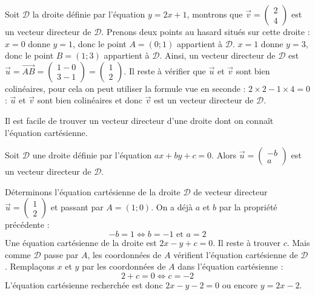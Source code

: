 	\begin{tip}[Exemple]
		Soit $\mathcal{D}$ la droite définie par l'équation $y = 2x + 1$, montrons que $\overrightarrow{v} = \begin{pmatrix} 2 \\ 4\end{pmatrix}$ est un vecteur directeur de $\mathcal{D}$.
		\newpar
		Prenons deux points au hasard situés sur cette droite :
		\newline
		$x = 0$ donne $y = 1$, donc le point $A = (0; 1)$ appartient à $\mathcal{D}$.
		\newline
		$x = 1$ donne $y = 3$, donc le point $B = (1; 3)$ appartient à $\mathcal{D}$.
		\newpar
		Ainsi, un vecteur directeur de $\mathcal{D}$ est $\overrightarrow{u} = \overrightarrow{AB} = \begin{pmatrix} 1-0 \\ 3-1\end{pmatrix} = \begin{pmatrix} 1 \\ 2\end{pmatrix}$.
		\newpar
		Il reste à vérifier que $\overrightarrow{u}$ et $\overrightarrow{v}$ sont bien colinéaires, pour cela on peut utiliser la formule vue en seconde :
		\newline
		$2 \times 2 - 1 \times 4 = 0$ : $\overrightarrow{u}$ et $\overrightarrow{v}$ sont bien colinéaires et donc $\overrightarrow{v}$ est un vecteur directeur de $\mathcal{D}$.
	\end{tip}

	Il est facile de trouver un vecteur directeur d'une droite dont on connaît l'équation cartésienne.

	\begin{formula}
		Soit $\mathcal{D}$ une droite définie par l'équation $ax + by + c = 0$. Alors $\overrightarrow{u} = \begin{pmatrix} -b \\ a\end{pmatrix}$ est un vecteur directeur de $\mathcal{D}$.
	\end{formula}

	\begin{tip}[Exemple]
		Déterminons l'équation cartésienne de la droite $\mathcal{D}$ de vecteur directeur $\overrightarrow{u} = \begin{pmatrix} 1 \\ 2\end{pmatrix}$ et passant par $A = (1; 0)$.
		\newpar
		On a déjà $a$ et $b$ par la propriété précédente :
		\[ -b = 1 \iff b = -1 \text{ et } a = 2 \]
		Une équation cartésienne de la droite est $2x - y + c = 0$. Il reste à trouver $c$. Mais comme $\mathcal{D}$ passe par $A$, les coordonnées de $A$ vérifient l'équation cartésienne de $\mathcal{D}$.
		\newpar
		Remplaçons $x$ et $y$ par les coordonnées de $A$ dans l'équation cartésienne : \[ 2 + c = 0 \iff c = -2 \]
		L'équation cartésienne recherchée est donc $2x - y - 2 = 0$ ou encore $y = 2x - 2$.
	\end{tip}

